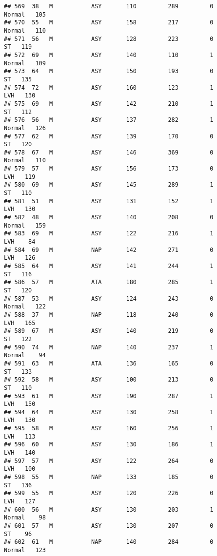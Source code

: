 \documentclass[
]{article}
\begin{document}
\begin{verbatim}
## 569  38   M           ASY       110         289         0     Normal   105
## 570  55   M           ASY       158         217         0     Normal   110
## 571  56   M           ASY       128         223         0         ST   119
## 572  69   M           ASY       140         110         1     Normal   109
## 573  64   M           ASY       150         193         0         ST   135
## 574  72   M           ASY       160         123         1        LVH   130
## 575  69   M           ASY       142         210         1         ST   112
## 576  56   M           ASY       137         282         1     Normal   126
## 577  62   M           ASY       139         170         0         ST   120
## 578  67   M           ASY       146         369         0     Normal   110
## 579  57   M           ASY       156         173         0        LVH   119
## 580  69   M           ASY       145         289         1         ST   110
## 581  51   M           ASY       131         152         1        LVH   130
## 582  48   M           ASY       140         208         0     Normal   159
## 583  69   M           ASY       122         216         1        LVH    84
## 584  69   M           NAP       142         271         0        LVH   126
## 585  64   M           ASY       141         244         1         ST   116
## 586  57   M           ATA       180         285         1         ST   120
## 587  53   M           ASY       124         243         0     Normal   122
## 588  37   M           NAP       118         240         0        LVH   165
## 589  67   M           ASY       140         219         0         ST   122
## 590  74   M           NAP       140         237         1     Normal    94
## 591  63   M           ATA       136         165         0         ST   133
## 592  58   M           ASY       100         213         0         ST   110
## 593  61   M           ASY       190         287         1        LVH   150
## 594  64   M           ASY       130         258         1        LVH   130
## 595  58   M           ASY       160         256         1        LVH   113
## 596  60   M           ASY       130         186         1        LVH   140
## 597  57   M           ASY       122         264         0        LVH   100
## 598  55   M           NAP       133         185         0         ST   136
## 599  55   M           ASY       120         226         0        LVH   127
## 600  56   M           ASY       130         203         1     Normal    98
## 601  57   M           ASY       130         207         0         ST    96
## 602  61   M           NAP       140         284         0     Normal   123

\end{verbatim}
\end{document}
